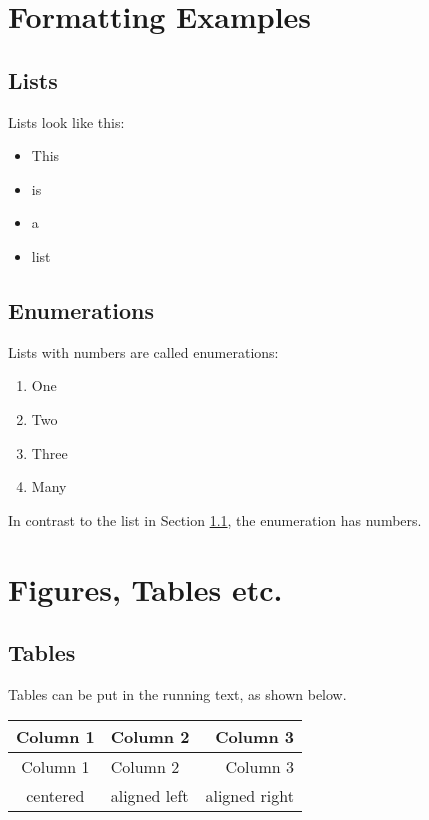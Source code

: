 \documentclass[12pt,leqno,a4paper]{article}
\begin{document}
\section{Formatting Examples}

\subsection{Lists}\label{listen}

Lists look like this:

\begin{itemize}
\item This 
\item is 
\item  a 
\item list 
\end{itemize}


\subsection{Enumerations}

Lists with numbers are called enumerations:

\begin{enumerate}
\item One
\item Two
\item Three 
\item Many
\end{enumerate}

In contrast to the list in Section \ref{listen}, the enumeration has numbers.


\section{Figures, Tables etc.}

\subsection{Tables}

Tables can be put in the running text, as shown below.

\begin{tabular}{clr}
\toprule
Column 1 & Column 2 & Column 3\\
\midrule
Column 1 & Column 2 & Column 3 \\
centered & aligned left &  aligned right \\
\bottomrule
\end{tabular}
\end{document}

